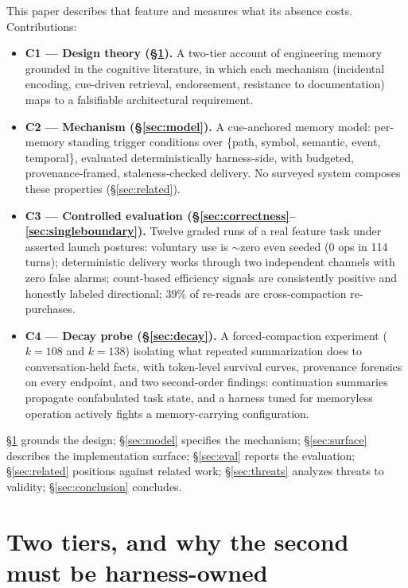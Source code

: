 \documentclass[11pt]{article}
\begin{document}
This paper describes that feature and measures what its absence costs.
Contributions:

\begin{itemize}
\item \textbf{C1 --- Design theory (\S\ref{sec:twotiers}).} A two-tier account of engineering memory
  grounded in the cognitive literature, in which each mechanism
  (incidental encoding, cue-driven retrieval, endorsement, resistance to
  documentation) maps to a falsifiable architectural requirement.
\item \textbf{C2 --- Mechanism (\S\ref{sec:model}).} A cue-anchored memory model: per-memory
  standing trigger conditions over \{path, symbol, semantic, event,
  temporal\}, evaluated deterministically harness-side, with budgeted,
  provenance-framed, staleness-checked delivery. No surveyed system
  composes these properties (\S\ref{sec:related}).
\item \textbf{C3 --- Controlled evaluation (\S\ref{sec:correctness}--\ref{sec:singleboundary}).} Twelve graded runs of a real
  feature task under asserted launch postures: voluntary use is $\sim$zero
  even seeded (0 ops in 114 turns); deterministic delivery works through
  two independent channels with zero false alarms; count-based
  efficiency signals are consistently positive and honestly labeled
  directional; 39\% of re-reads are cross-compaction re-purchases.
\item \textbf{C4 --- Decay probe (\S\ref{sec:decay}).} A forced-compaction experiment ($k=108$ and
  $k=138$) isolating what repeated summarization does to conversation-held
  facts, with token-level survival curves, provenance forensics on every
  endpoint, and two second-order findings: continuation summaries
  propagate confabulated task state, and a harness tuned for memoryless
  operation actively fights a memory-carrying configuration.
\end{itemize}

\S\ref{sec:twotiers} grounds the design; \S\ref{sec:model} specifies the mechanism; \S\ref{sec:surface} describes the
implementation surface; \S\ref{sec:eval} reports the evaluation; \S\ref{sec:related} positions against
related work; \S\ref{sec:threats} analyzes threats to validity; \S\ref{sec:conclusion} concludes.

\section{Two tiers, and why the second must be harness-owned}
\label{sec:twotiers}
\end{document}
